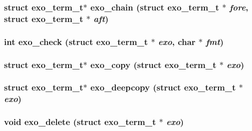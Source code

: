 \subsubsection[{exo\_\-chain}]{\setlength{\rightskip}{0pt plus 5cm}struct {\bf exo\_\-term\_\-t}$\ast$ exo\_\-chain (struct {\bf exo\_\-term\_\-t} $\ast$ {\em fore}, \/  struct {\bf exo\_\-term\_\-t} $\ast$ {\em aft})\hspace{0.3cm}{\tt  [read]}}\label{libexo_8h_56f32be22ecd93a2f74cba73748c684c}


\subsubsection[{exo\_\-check}]{\setlength{\rightskip}{0pt plus 5cm}int exo\_\-check (struct {\bf exo\_\-term\_\-t} $\ast$ {\em exo}, \/  char $\ast$ {\em fmt})}\label{libexo_8h_1cac107a347c0a5e66b37943bb65f5db}


\subsubsection[{exo\_\-copy}]{\setlength{\rightskip}{0pt plus 5cm}struct {\bf exo\_\-term\_\-t}$\ast$ exo\_\-copy (struct {\bf exo\_\-term\_\-t} $\ast$ {\em exo})\hspace{0.3cm}{\tt  [read]}}\label{libexo_8h_e82154e12e4c12fcbbdd022e22c6b4d8}


\subsubsection[{exo\_\-deepcopy}]{\setlength{\rightskip}{0pt plus 5cm}struct {\bf exo\_\-term\_\-t}$\ast$ exo\_\-deepcopy (struct {\bf exo\_\-term\_\-t} $\ast$ {\em exo})\hspace{0.3cm}{\tt  [read]}}\label{libexo_8h_c04a8efc394dc8bd7b894915f4ae560d}


\subsubsection[{exo\_\-delete}]{\setlength{\rightskip}{0pt plus 5cm}void exo\_\-delete (struct {\bf exo\_\-term\_\-t} $\ast$ {\em exo})}\label{libexo_8h_20579e0b9063e7392797cb69a6028b9e}


